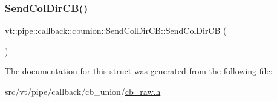 \subsubsection{\texorpdfstring{Send\+Col\+Dir\+C\+B()}{SendColDirCB()}}
{\footnotesize\ttfamily vt\+::pipe\+::callback\+::cbunion\+::\+Send\+Col\+Dir\+C\+B\+::\+Send\+Col\+Dir\+CB (\begin{DoxyParamCaption}{ }\end{DoxyParamCaption})\hspace{0.3cm}{\ttfamily [default]}}



The documentation for this struct was generated from the following file\+:\begin{DoxyCompactItemize}
\item 
src/vt/pipe/callback/cb\+\_\+union/\hyperlink{cb__raw_8h}{cb\+\_\+raw.\+h}\end{DoxyCompactItemize}

